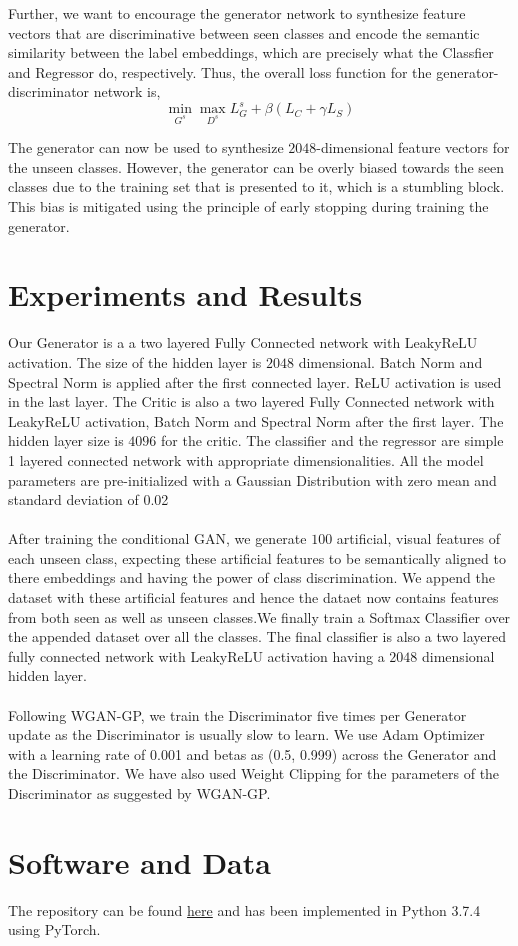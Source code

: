 \documentclass{article}
\begin{document}
Further, we want to encourage the generator network to synthesize feature vectors that are discriminative between seen classes and encode the semantic similarity between the label embeddings, which are precisely what the Classfier and Regressor do, respectively. Thus, the overall loss function for the generator-discriminator network is,
\begin{equation}
	\min_{G^s} \max_{D^s}	L_G^s + \beta (L_C + \gamma L_S)
\end{equation}

The generator can now be used to synthesize $2048$-dimensional feature vectors for the unseen classes. However, the generator can be overly biased towards the seen classes due to the training set that is presented to it, which is a stumbling block. This bias is mitigated using the principle of early stopping during training the generator. 

\section{Experiments and Results}
\label{experiments}
Our Generator is a a two layered Fully Connected network with LeakyReLU activation. The size of the hidden layer is $2048$ dimensional. Batch Norm and Spectral Norm is applied after the first connected layer. ReLU activation is used in the last layer. The Critic is also a two layered Fully Connected network with LeakyReLU activation, Batch Norm and Spectral Norm after the first layer. The hidden layer size is $4096$ for the critic.
The classifier and the regressor are simple 1 layered connected network with appropriate dimensionalities. All the model parameters are pre-initialized with a Gaussian Distribution with zero mean and standard deviation of 0.02\\
\\
After training the conditional GAN, we generate $100$ artificial, visual features of each unseen class, expecting these artificial features to be semantically aligned to there embeddings and having the power of class discrimination. We append the dataset with these artificial features and hence the dataet now contains features from both seen as well as unseen classes.We finally train a Softmax Classifier over the appended dataset over all the classes. The final classifier is also a two layered fully connected network with LeakyReLU activation having a $2048$ dimensional hidden layer. \\
\\
Following WGAN-GP, we train the Discriminator five times per Generator update as the Discriminator is usually slow to learn. We use Adam Optimizer with a learning rate of 0.001 and betas as (0.5, 0.999) across the Generator and the Discriminator. We have also used Weight Clipping for the parameters of the Discriminator as suggested by WGAN-GP.
\medskip

\section*{Software and Data}
The repository can be found \href{https://github.com/deepeshhada/SABR}{here} and has been implemented in Python 3.7.4 using PyTorch.

\medskip



\end{document}
